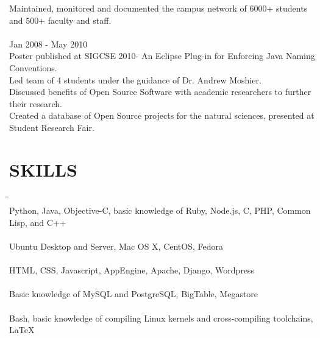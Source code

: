 \documentclass{res}
\begin{document}
\begin{resume}
\begin{tabbing}
    Maintained, monitored and documented the campus network of 6000+ students and 500+ faculty and staff.\\
\\
  \hspace{-0.25in}{\bf Student Researcher, Chapman University CS Department} \> \> Jan 2008 - May 2010\\
    Poster published at SIGCSE 2010- An Eclipse Plug-in for Enforcing Java Naming Conventions.\\
    Led team of 4 students under the guidance of Dr. Andrew Moshier.\\
    Discussed benefits of Open Source Software with academic researchers to further their research.\\
    Created a database of Open Source projects for the natural sciences, presented at Student Research Fair. \\
  \end{tabbing}
  \vspace{-0.4in}

\section{SKILLS}
  \vspace{-5pt}
  \begin{tabbing}
  \hspace{2.5in}\= \hspace{3.45in}\= \kill %
  \hspace{-0.25in}{\bf Programming Languages} \> \> \\
    Python, Java, Objective-C, basic knowledge of Ruby, Node.js, C, PHP, Common Lisp, and C++\\
  \hspace{-0.25in}{\bf Operating Systems} \> \> \\
    Ubuntu Desktop and Server, Mac OS X, CentOS, Fedora\\
  \hspace{-0.25in}{\bf Web Development} \> \> \\
    HTML, CSS, Javascript, AppEngine, Apache, Django, Wordpress\\
  \hspace{-0.25in}{\bf Databases} \> \> \\
    Basic knowledge of MySQL and PostgreSQL, BigTable, Megastore\\
  \hspace{-0.25in}{\bf Systems Administration} \> \> \\
    Bash, basic knowledge of compiling Linux kernels and cross-compiling toolchains, \LaTeX\\
  \vspace{-0.4in}


\end{tabbing}
\end{resume}
\end{document}
